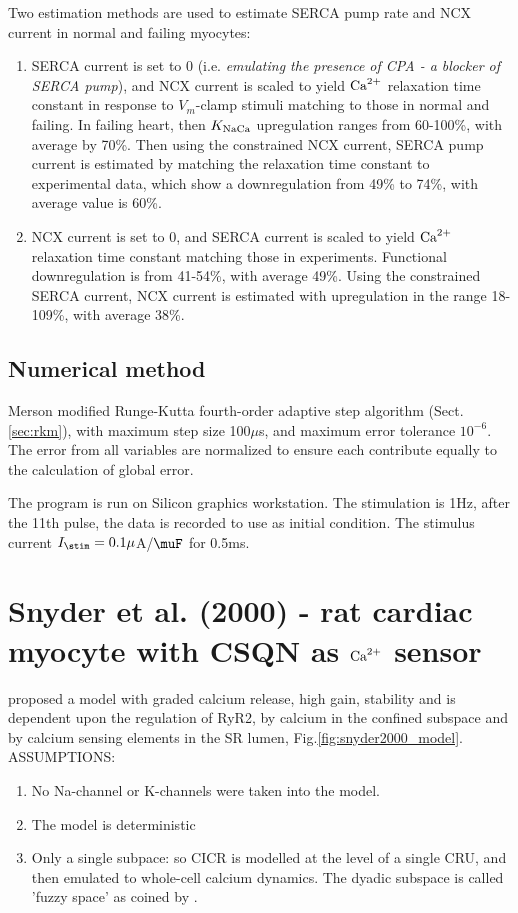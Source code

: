 Two estimation methods are used to estimate SERCA pump rate and NCX
current in normal and failing myocytes:
\begin{enumerate}
\item SERCA current is set to 0 (i.e.
  {\it emulating the presence of CPA - a blocker of SERCA pump}), and
  NCX current is scaled to yield ${\text{Ca}^{2+}}$ relaxation time constant in
  response to $V_m$-clamp stimuli matching to those in normal and
  failing. In failing heart, then $K_{\text{NaCa}}$ upregulation ranges from
  60-100\%, with average by 70\%. Then using the constrained NCX
  current, SERCA pump current is estimated by matching the relaxation
  time constant to experimental data, which show a downregulation from
  49\% to 74\%, with average value is 60\%. 

\item NCX current is set to 0, and SERCA current is scaled to yield
  ${\text{Ca}^{2+}}$ relaxation time constant matching those in
  experiments. Functional downregulation is from 41-54\%, with average
  49\%. Using the constrained SERCA current, NCX current is estimated
  with upregulation in the range 18-109\%, with average 38\%. 
\end{enumerate}

\subsection{Numerical method}

Merson modified Runge-Kutta fourth-order adaptive step algorithm
(Sect.\ref{sec:rkm}), with maximum step size 100$\mu$s, and maximum error
tolerance $10^{-6}$. The error from all variables are normalized to ensure each
contribute equally to the calculation of global error. 

The program is run on Silicon graphics workstation.  The stimulation
is 1Hz, after the 11th pulse, the data is recorded to use as initial
condition. The stimulus current $I_\stim=0.1\mu$A/$\muF$ for 0.5ms.


\section{Snyder et al. (2000) - rat cardiac myocyte with CSQN as ${\text{Ca}^{2+}}$ sensor}
\label{sec:snyder_2000}

\citep{snyder2000mmc} proposed a model with graded calcium release, high gain,
stability and is dependent upon the regulation of RyR2, by calcium in the
confined subspace and by calcium sensing elements in the SR lumen,
Fig.\ref{fig:snyder2000_model}. ASSUMPTIONS:
\begin{enumerate}
  \item No Na-channel or K-channels were taken into the model.
  \item The model is deterministic
  \item Only a single subpace:  so CICR is modelled at the level of a single
  CRU, and then emulated to whole-cell calcium dynamics. The dyadic subspace is
  called 'fuzzy space' as coined by \citep{lederer1990}.

\end{enumerate}


